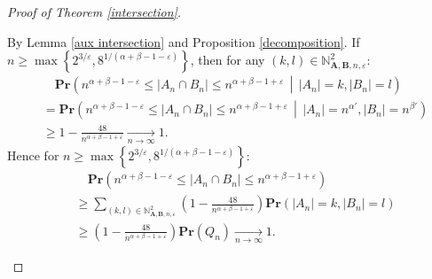 \documentclass[10pt,a4paper]{amsart}
\def\Pr{\mathbf{Pr}}
\newcommand{\bs}{\boldsymbol}
\newcommand{\tendvers}{\xrightarrow[n\to\infty]{}}
\begin{document}
\begin{proof}[Proof of Theorem \ref{intersection}]
\begin{enumerate}[(i)]
        By Lemma \ref{aux intersection} and Proposition \ref{decomposition}. If $n\geq \max\left\{2^{3/\varepsilon},8^{1/(\alpha+\beta-1-\varepsilon)}\right\}$, then for any $(k,l)\in \mathbb{N}^2_{\bs A,\bs B, n, \varepsilon}$:
        \[\begin{split} &\quad \Pr\left(n^{\alpha+\beta-1-\varepsilon}\leq |A_n\cap B_n|\leq n^{\alpha+\beta-1+\varepsilon} \,\middle|\, |A_n|= k,|B_n| = l \right)\\
        & = \Pr\left(n^{\alpha+\beta-1-\varepsilon}\leq |A_n\cap B_n|\leq n^{\alpha+\beta-1+\varepsilon} \,\middle|\, |A_n|=n^{\alpha'},|B_n| = n^{\beta'}\right)\\
        & \geq 1-\frac{48}{n^{\alpha+\beta-1+\varepsilon}} \tendvers 1.
        \end{split}
        \]
        Hence for $n\geq \max\left\{2^{3/\varepsilon},8^{1/(\alpha+\beta-1-\varepsilon)}\right\}$:
        \[\begin{split} & \quad \Pr(n^{\alpha+\beta-1-\varepsilon}\leq|A_n\cap B_n|\leq n^{\alpha+\beta-1+\varepsilon})\\
        &\geq \sum_{(k,l)\in\mathbb{N}^2_{\bs A,\bs B, n, \varepsilon}} \left( 1-\frac{48}{n^{\alpha+\beta-1+\varepsilon}} \right) \Pr(|A_n|=k, |B_n|=l)\\
        &\geq \left(1-\frac{48}{n^{\alpha+\beta-1+\varepsilon}}\right)\Pr(Q_n)\tendvers 1.
        \end{split}\]
            
    \end{enumerate}
\end{proof}
\end{document}

